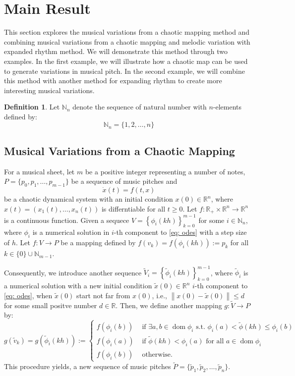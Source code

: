 \documentclass[11pt]{article}
\theoremstyle{definition}
\newtheorem{definition}[theorem]{Definition}
\DeclareMathOperator{\dom}{dom}
\begin{document}
\section{Main Result}
\label{sec: mainresult}
This section explores the musical variations from a chaotic mapping method and combining musical variations from a chaotic mapping and melodic variation with expanded rhythm method. We will demonstrate this method through two examples. In the first example, we will illustrate how a chaotic map can be used to generate variations in musical pitch. In the second example, we will combine this method with another method for expanding rhythm to create more interesting musical variations.

\begin{definition}
Let $\mathbb{N}_n$ denote the sequence of natural number with $n$-elements defined by:
\[ \mathbb{N}_n = \{ 1, 2, \dots, n \}  \]
\end{definition}

\subsection{Musical Variations from a Chaotic Mapping}

For a musical sheet, let $m$ be a positive integer representing a number of notes, $P = \{p_0, p_1, \dots, p_{m-1}\}$ be a sequence of music pitches and  
\begin{equation} \label{eq: odes}
\dot{x}(t) = f(t,x)
\end{equation}
be a chaotic dynamical system with an initial condition $x(0) \in \mathbb{R}^n$, where $x(t) = \left(x_1(t), \ldots, x_n(t)\right)$ is differntiable for all $t \geq 0$.
Let $f: \mathbb{R}_{+} \times \mathbb{R}^n \to \mathbb{R}^n$ is a continuous function. 
Given a sequece
$ V = \displaystyle\left\{\phi_i(kh) \right\}_{k=0}^{m-1}$ 
for some $i \in \mathbb{N}_n$, where $\phi_i$ is a numerical solution in $i$-th component to \eqref{eq: odes} with a step size of $h$.
Let $ f: V \to P$ be a mapping defined by 
$f(v_k) = f(\phi_i(kh)) := p_k$ for all $k \in \{0\}\cup\mathbb{N}_{m-1}$.

Consequently, we introduce another sequence $\widetilde{V}_i = \left\{\tilde{\phi}_i(kh) \right\}_{k=0}^{m-1}$, where $\tilde{\phi}_i$ is a numerical solution with a new initial condition $\tilde{x}(0) \in \mathbb{R}^n$ $i$-th component to \eqref{eq: odes}, 
when $\tilde{x}(0)$ start not far from $x(0)$, i.e., $ \left\lVert x(0) - \tilde{x}(0) \right\rVert \leq d$ for some small positve number $d \in \mathbb{R}$. Then, we define another mapping $g: \widetilde{V} \to P$ by: 
\[ g(\tilde{v}_k) = g\left(\tilde{\phi}_i(kh)\right) := 
\begin{cases}
  f(\phi_i(b)) & \text{ if }\exists a, b \in \dom{\phi_i} \text{ s.t. } \phi_i(a) < \tilde{\phi}(kh) \leq \phi_i(b) \\
  f(\phi_i(a)) & \text{ if } \tilde{\phi}(kh) < \phi_i(a) \text{ for all } a \in \dom{\phi_i} \\
  f(\phi_i(b)) & \text{ otherwise} .
\end{cases}
\]
This procedure yields, a new sequence of music pitches $\widetilde{P} =\{ \tilde{p}_1, \tilde{p}_2, \dots, \tilde{p}_n \}$.
\end{document}
